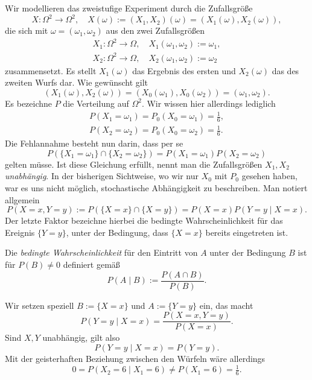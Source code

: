 Wir modellieren das zweistufige Experiment durch die Zufallsgröße
\[X\colon\Omega^2\to\Omega^2,\quad X(\omega) := (X_1,X_2)(\omega)
= (X_1(\omega), X_2(\omega)),\]
die sich mit $\omega = (\omega_1,\omega_2)$ aus den zwei Zufallsgrößen
\begin{gather*}
X_1\colon\Omega^2\to\Omega,\quad X_1(\omega_1,\omega_2) := \omega_1,\\
X_2\colon\Omega^2\to\Omega,\quad X_2(\omega_1,\omega_2) := \omega_2
\end{gather*}
zusammensetzt. Es stellt $X_1(\omega)$ das Ergebnis des ersten und
$X_2(\omega)$ das des zweiten Wurfs dar. Wie gewünscht gilt
\[(X_1(\omega),X_2(\omega)) = (X_0(\omega_1),X_0(\omega_2)) = (\omega_1,\omega_2).\]
Es bezeichne $P$ die Verteilung auf $\Omega^2$. Wir wissen hier allerdings
lediglich
\begin{gather*}
P(X_1=\omega_1) = P_0(X_0=\omega_1) = \tfrac{1}{6},\\
P(X_2=\omega_2) = P_0(X_0=\omega_2) = \tfrac{1}{6}.
\end{gather*}
Die Fehlannahme besteht nun darin, dass per se
\[P(\{X_1=\omega_1\}\cap\{X_2=\omega_2\}) = P(X_1=\omega_1)P(X_2=\omega_2)\]
gelten müsse. Ist diese Gleichung erfüllt, nennt man die
Zufallsgrößen $X_1,X_2$ \emph{unabhängig}. In der bisherigen Sichtweise,
wo wir nur $X_0$ mit $P_0$ gesehen haben, war es uns nicht möglich,
stochastische Abhängigkeit zu beschreiben. Man notiert allgemein%
\[P(X=x,Y=y) := P(\{X=x\}\cap\{X=y\}) = P(X=x)P(Y=y\mid X=x).\]
Der letzte Faktor bezeichne hierbei die bedingte Wahrscheinlichkeit
für das Ereignis $\{Y=y\}$, unter der Bedingung, dass $\{X=x\}$
bereits eingetreten ist.
\begin{Definition}\newlinefirst
Die \emph{bedingte Wahrscheinlichkeit} für den Eintritt von $A$ unter
der Bedingung $B$ ist für $P(B)\ne 0$ definiert gemäß
\[P(A\mid B) := \frac{P(A\cap B)}{P(B)}.\]
\end{Definition}
Wir setzen speziell $B:=\{X=x\}$ und $A:=\{Y=y\}$ ein,
das macht
\[P(Y=y\mid X=x) = \frac{P(X=x,Y=y)}{P(X=x)}.\]
Sind $X,Y$ unabhängig, gilt also
\[P(Y=y\mid X=x) = P(Y=y).\]
Mit der geisterhaften Beziehung zwischen den Würfeln wäre allerdings
\[0 = P(X_2=6\mid X_1=6) \ne P(X_1=6) = \tfrac{1}{6}.\]

